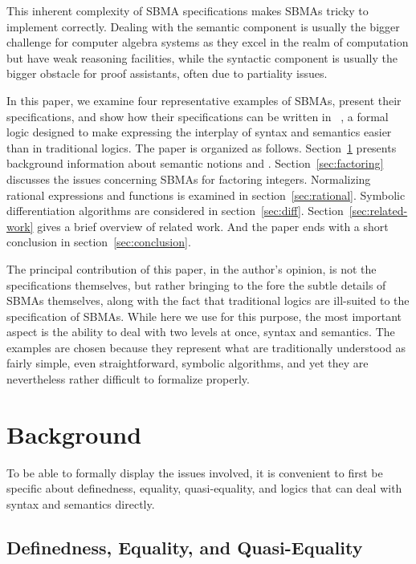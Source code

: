 \documentclass[fleqn]{llncs}
\begin{document}
This inherent complexity of SBMA specifications makes SBMAs
tricky to implement correctly.  Dealing with the semantic component is usually
the bigger challenge for computer algebra systems as they excel in the
realm of computation but have weak reasoning facilities, while the syntactic
component is usually the bigger obstacle for proof assistants, often due
to partiality issues.

\bsp In this paper, we examine four representative examples of SBMAs,
present their specifications, and show how their specifications can be
written in {\churchuqe}~\cite{Farmer17}, a formal logic designed to
make expressing the interplay of syntax and semantics easier than in
traditional logics.  The paper is organized as follows.
Section~\ref{sec:background} presents background information about
semantic notions and {\churchuqe}.  Section~\ref{sec:factoring}
discusses the issues concerning SBMAs for factoring
integers. Normalizing rational expressions and functions is examined
in section~\ref{sec:rational}.  Symbolic differentiation algorithms
are considered in section~\ref{sec:diff}.
Section~\ref{sec:related-work} gives a brief overview of related work.
And the paper ends with a short conclusion in
section~\ref{sec:conclusion}.  \esp

The principal contribution of this paper, in the author's opinion, is
not the specifications themselves, but rather bringing to the fore the
subtle details of SBMAs themselves, along with the fact that traditional
logics are ill-suited to the specification of SBMAs.  While here we use
{\churchuqe} for this purpose, the most important aspect is the
ability to deal with two levels at once, syntax and semantics. The examples
are chosen because they represent what are traditionally understood as
fairly simple, even straightforward, symbolic algorithms, and yet they
are nevertheless rather difficult to formalize properly.

\section{Background}\label{sec:background}

To be able to formally display the issues involved, it is convenient
to first be specific about definedness, equality, quasi-equality,
and logics that can deal with syntax and semantics directly.

\subsection{Definedness, Equality, and Quasi-Equality}
\end{document}
